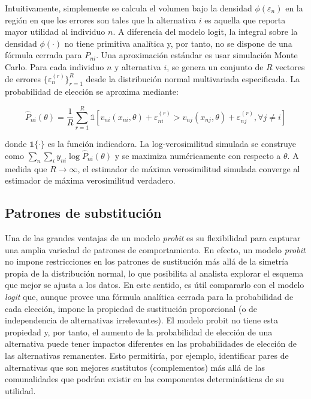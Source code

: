\documentclass[
]{book}
\begin{document}
Intuitivamente, simplemente se calcula el volumen bajo la densidad \(\phi(\varepsilon_n)\) en la región en que los errores son tales que la alternativa \(i\) es aquella que reporta mayor utilidad al individuo \(n\). A diferencia del modelo logit, la integral sobre la densidad \(\phi(\cdot)\) no tiene primitiva analítica y, por tanto, no se dispone de una fórmula cerrada para \(P_{ni}\). Una aproximación estándar es usar simulación Monte Carlo. Para cada individuo \(n\) y alternativa \(i\), se genera un conjunto de \(R\) vectores de errores \(\{\varepsilon_n^{(r)}\}_{r=1}^R\) desde la distribución normal multivariada especificada. La probabilidad de elección se aproxima mediante:

\begin{equation}
\hat{P}_{ni}(\theta) = \frac{1}{R}\sum_{r=1}^R \mathbb{1}\left[v_{ni}(x_{ni},\theta) + \varepsilon_{ni}^{(r)} > v_{nj}(x_{nj},\theta) + \varepsilon_{nj}^{(r)}, \forall j \neq i\right]
\label{eq:simprob}
\end{equation}

donde \(\mathbb{1}\{\cdot\}\) es la función indicadora. La log-verosimilitud simulada se construye como \(\sum_n\sum_i y_{ni}\log\hat{P}_{ni}(\theta)\) y se maximiza numéricamente con respecto a \(\theta\). A medida que \(R \to \infty\), el estimador de máxima verosimilitud simulada converge al estimador de máxima verosimilitud verdadero.

\subsection{Patrones de substitución}\label{patrones-de-substituciuxf3n}

Una de las grandes ventajas de un modelo \emph{probit} es su flexibilidad para capturar una amplia variedad de patrones de comportamiento. En efecto, un modelo \emph{probit} no impone restricciones en los patrones de sustitución más allá de la simetría propia de la distribución normal, lo que posibilita al analista explorar el esquema que mejor se ajusta a los datos. En este sentido, es útil compararlo con el modelo \emph{logit} que, aunque provee una fórmula analítica cerrada para la probabilidad de cada elección, impone la propiedad de sustitución proporcional (o de independencia de alternativas irrelevantes). El modelo probit no tiene esta propiedad y, por tanto, el aumento de la probabilidad de elección de una alternativa puede tener impactos diferentes en las probabilidades de elección de las alternativas remanentes. Esto permitiría, por ejemplo, identificar pares de alternativas que son mejores sustitutos (complementos) más allá de las comunalidades que podrían existir en las componentes determinísticas de su utilidad.
\end{document}

